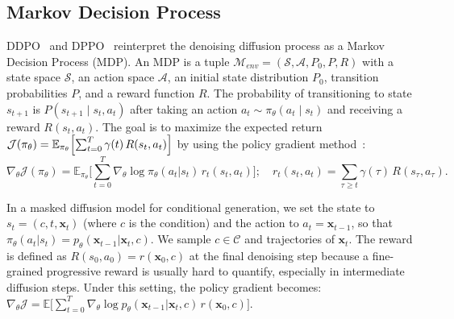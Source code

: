 \subsection{Markov Decision Process}
DDPO~\citep{black2023training} and DPPO~\citep{ren2024diffusion} reinterpret the denoising diffusion process as a Markov Decision Process (MDP). An MDP is a tuple $\mathcal M_{env} = (\mathcal S,\mathcal A,P_0,P,R)$ with a state space $\mathcal S$, an action space $\mathcal A$, an initial state distribution $P_0$, transition probabilities $P$, and a reward function $R$. The probability of transitioning to state $s_{t+1}$ is $P(s_{t+1}\mid s_t,a_t)$ after taking an action $a_t \sim \pi_\theta(a_t\mid s_t)$ and receiving a reward $R(s_t,a_t)$. The goal is to maximize the expected return $\mathcal J(\pi_\theta)=\mathbb{E}_{\pi_\theta}\Bigl[\sum_{t=0}^T \gamma(t)\,R(s_t,a_t)\Bigr]$ by using the policy gradient method~\citep{williams1992simple}:
\begin{equation}
    \label{eq:ddpo-loss}
    \nabla_\theta \mathcal J(\pi_\theta)
    =\mathbb{E}_{\pi_\theta}\bigl[\sum_{t=0}^T\nabla_\theta\log\pi_\theta(a_t| s_t)\,r_t(s_t,a_t)\bigr]; \quad r_t(s_t,a_t)=\sum_{\tau\ge t}\gamma(\tau)\,R(s_\tau,a_\tau).
\end{equation}

In a masked diffusion model for conditional generation, we set the state to $s_t=(c,t,\bm{x}_t)$ (where $c$ is the condition) and the action to $a_t=\bm{x}_{t-1}$, so that $\pi_\theta(a_t| s_t)=p_\theta(\bm{x}_{t-1}| \bm{x}_t,c)$. We sample $c\in \mathcal C$ and trajectories of $\bm{x}_{t}$. The reward is defined as $R(s_0,a_0)=r(\bm{x}_0,c)$ at the final denoising step because a fine-grained progressive reward is usually hard to quantify, especially in intermediate diffusion steps. Under this setting, the policy gradient becomes:
$\nabla_\theta \mathcal J
=\mathbb{E}\bigl[\sum_{t=0}^T\nabla_\theta\log p_\theta(\bm{x}_{t-1}|\bm{x}_t,c)\,r(\bm{x}_0,c)\bigr]$.

